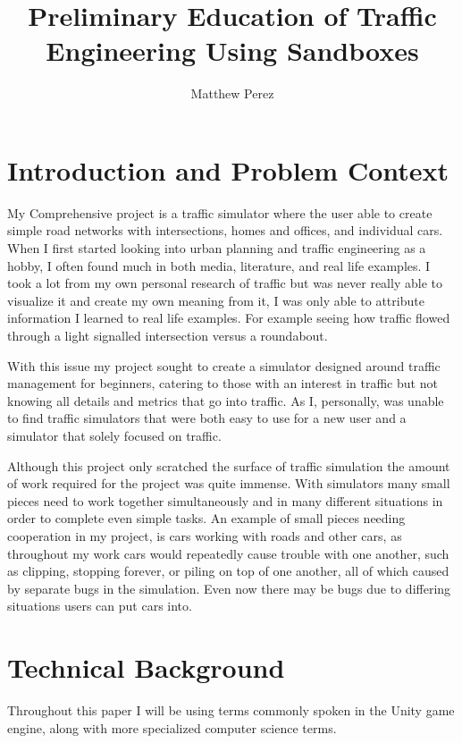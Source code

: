 \documentclass[10pt,twocolumn]{article}
\title{Preliminary Education of Traffic Engineering Using Sandboxes}
\author{Matthew Perez}
\affiliation{Occidental College}
\begin{document}
\maketitle

\section{Introduction and Problem Context}
\label{Introduction and Problem Context}

My Comprehensive project is a traffic simulator where the user able to create simple road networks with intersections, homes and offices, and individual cars. When I first started looking into urban planning and traffic engineering as a hobby, I often found much in both media, literature, and real life examples. I took a lot from my own personal research of traffic but was never really able to visualize it and create my own meaning from it, I was only able to attribute information I learned to real life examples. For example seeing how traffic flowed through a light signalled intersection versus a roundabout. 

With this issue my project sought to create a simulator designed around traffic management for beginners, catering to those with an interest in traffic but not knowing all details and metrics that go into traffic. As I, personally, was unable to find traffic simulators that were both easy to use for a new user and a simulator that solely focused on traffic. 

Although this project only scratched the surface of traffic simulation the amount of work required for the project was quite immense. With simulators many small pieces need to work together simultaneously and in many different situations in order to complete even simple tasks. An example of small pieces needing cooperation in my project, is cars working with roads and other cars, as throughout my work cars would repeatedly cause trouble with one another, such as clipping, stopping forever, or piling on top of one another, all of which caused by separate bugs in the simulation. Even now there may be bugs due to differing situations users can put cars into. 
\section{Technical Background}

Throughout this paper I will be using terms commonly spoken in the Unity game engine, along with more specialized computer science terms.
\end{document}
